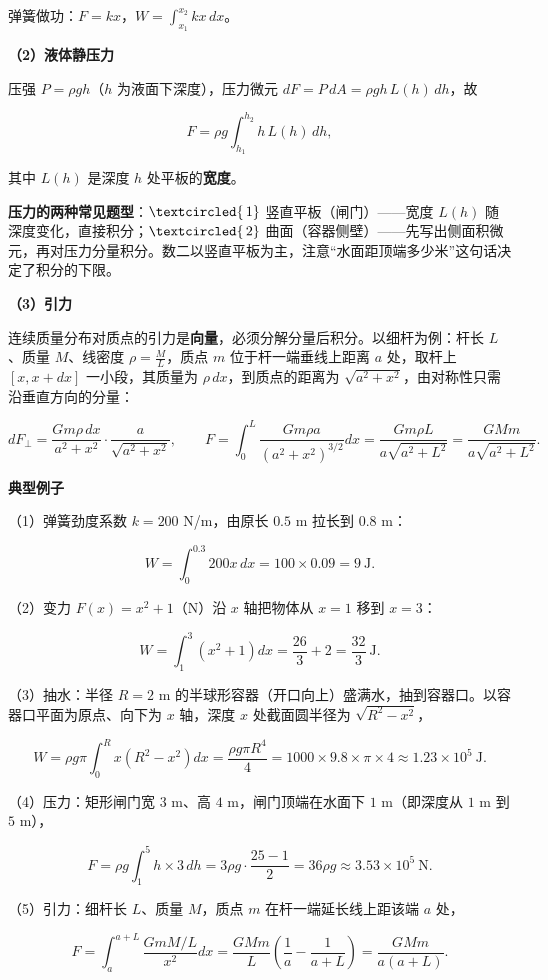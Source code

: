 \documentclass[11pt,openany,UTF8]{ctexbook}
\newcommand{\circled}[1]{\textcircled{\scriptsize\,#1}}
\begin{document}
弹簧做功：$F=kx$，$W=\displaystyle\int_{x_1}^{x_2}kx\,dx$。

\textbf{（2）液体静压力}

压强 $P=\rho gh$（$h$ 为液面下深度），压力微元 $dF=P\,dA=\rho gh\,L(h)\,dh$，故

\[F=\rho g\int_{h_1}^{h_2}h\,L(h)\,dh,\]

其中 $L(h)$ 是深度 $h$ 处平板的\textbf{宽度}。

\textbf{压力的两种常见题型}：$\circled{1}$ 竖直平板（闸门）——宽度 $L(h)$ 随深度变化，直接积分；$\circled{2}$ 曲面（容器侧壁）——先写出侧面积微元，再对压力分量积分。数二以竖直平板为主，注意“水面距顶端多少米”这句话决定了积分的下限。

\textbf{（3）引力}

连续质量分布对质点的引力是\textbf{向量}，必须分解分量后积分。以细杆为例：杆长 $L$、质量 $M$、线密度 $\rho=\frac{M}{L}$，质点 $m$ 位于杆一端垂线上距离 $a$ 处，取杆上 $[x,x+dx]$ 一小段，其质量为 $\rho\,dx$，到质点的距离为 $\sqrt{a^2+x^2}$，由对称性只需沿垂直方向的分量：

\[dF_{\perp}=\frac{Gm\rho\,dx}{a^2+x^2}\cdot\frac{a}{\sqrt{a^2+x^2}},\qquad F=\int_0^L\frac{Gm\rho a}{\left(a^2+x^2\right)^{3/2}}dx=\frac{Gm\rho L}{a\sqrt{a^2+L^2}}=\frac{GMm}{a\sqrt{a^2+L^2}}.\]

\textbf{典型例子}

（1）弹簧劲度系数 $k=200$ N/m，由原长 $0.5$ m 拉长到 $0.8$ m：

\[W=\int_0^{0.3}200x\,dx=100\times0.09=9\ \text{J}.\]

（2）变力 $F(x)=x^2+1$（N）沿 $x$ 轴把物体从 $x=1$ 移到 $x=3$：

\[W=\int_1^3\left(x^2+1\right)dx=\frac{26}{3}+2=\frac{32}{3}\ \text{J}.\]

（3）抽水：半径 $R=2$ m 的半球形容器（开口向上）盛满水，抽到容器口。以容器口平面为原点、向下为 $x$ 轴，深度 $x$ 处截面圆半径为 $\sqrt{R^2-x^2}$，

\[W=\rho g\pi\int_0^{R}x\left(R^2-x^2\right)dx=\frac{\rho g\pi R^4}{4}=1000\times9.8\times\pi\times4\approx1.23\times10^{5}\ \text{J}.\]

（4）压力：矩形闸门宽 $3$ m、高 $4$ m，闸门顶端在水面下 $1$ m（即深度从 $1$ m 到 $5$ m），

\[F=\rho g\int_1^5h\times3\,dh=3\rho g\cdot\frac{25-1}{2}=36\rho g\approx3.53\times10^{5}\ \text{N}.\]

（5）引力：细杆长 $L$、质量 $M$，质点 $m$ 在杆一端延长线上距该端 $a$ 处，

\[F=\int_a^{a+L}\frac{GmM/L}{x^2}dx=\frac{GMm}{L}\left(\frac{1}{a}-\frac{1}{a+L}\right)=\frac{GMm}{a(a+L)}.\]
\end{document}
